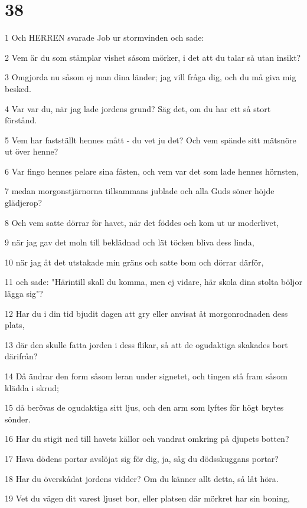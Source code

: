 \chapter{38}

\par 1 Och HERREN svarade Job ur stormvinden och sade:
\par 2 Vem är du som stämplar vishet såsom mörker, i det att du talar så utan insikt?
\par 3 Omgjorda nu såsom ej man dina länder; jag vill fråga dig, och du må giva mig besked.
\par 4 Var var du, när jag lade jordens grund? Säg det, om du har ett så stort förstånd.
\par 5 Vem har fastställt hennes mått - du vet ju det? Och vem spände sitt mätsnöre ut över henne?
\par 6 Var fingo hennes pelare sina fästen, och vem var det som lade hennes hörnsten,
\par 7 medan morgonstjärnorna tillsammans jublade och alla Guds söner höjde glädjerop?
\par 8 Och vem satte dörrar för havet, när det föddes och kom ut ur moderlivet,
\par 9 när jag gav det moln till beklädnad och lät töcken bliva dess linda,
\par 10 när jag åt det utstakade min gräns och satte bom och dörrar därför,
\par 11 och sade: "Härintill skall du komma, men ej vidare, här skola dina stolta böljor lägga sig"?
\par 12 Har du i din tid bjudit dagen att gry eller anvisat åt morgonrodnaden dess plats,
\par 13 där den skulle fatta jorden i dess flikar, så att de ogudaktiga skakades bort därifrån?
\par 14 Då ändrar den form såsom leran under signetet, och tingen stå fram såsom klädda i skrud;
\par 15 då berövas de ogudaktiga sitt ljus, och den arm som lyftes för högt brytes sönder.
\par 16 Har du stigit ned till havets källor och vandrat omkring på djupets botten?
\par 17 Hava dödens portar avslöjat sig för dig, ja, såg du dödsskuggans portar?
\par 18 Har du överskådat jordens vidder? Om du känner allt detta, så låt höra.
\par 19 Vet du vägen dit varest ljuset bor, eller platsen där mörkret har sin boning,
